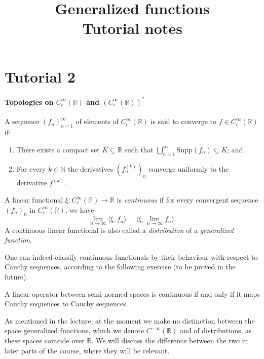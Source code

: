 \documentclass[12pt, draft,reqno,a4paper, twoside]{amsproc}
\title{Generalized functions\\Tutorial notes}
\newcommand{\supp}{\mathrm{Supp}}
\newcommand{\dbN}{\mathbb N}
\newcommand{\dbR}{\mathbb R}
\newcommand{\gen}[1]{\langle{#1}\rangle}
\begin{document}
\maketitle
\part*{Tutorial 2}\setcounter{section}{2}
\subsection{Topologies on $C_c^\infty(\dbR)$ and $(C_c^\infty(\dbR))^*$}
\begin{defi}[Convergence in $C_c^\infty(\dbR)$] A sequence $(f_n)_{n=1}^\infty$ of elements of $C_c^\infty(\dbR)$ is said to converge to $f\in C_c^\infty(\dbR)$ if:
\begin{enumerate}
\item There exists a compact set $K\subseteq \dbR$ such that $\bigcup_{n=1}^\infty \supp(f_n)\subseteq K$; and
\item For every $k\in\dbN$ the derivatives $(f_n^{(k)})_n$ converge uniformly to the derivative $f^{(k)}$.
\end{enumerate}
\end{defi}

\begin{defi}[Distributions] A linear functional $\xi:C_c^\infty(\dbR)\to \dbR$ is \emph{continuous} if for every convergent sequence $(f_n)_n$ in $C_c^{\infty}(\dbR)$, we have 
\[\lim_{n\to\infty}\gen{\xi,f_n}=\gen{\xi,\lim_{n\to\infty}f_n}.\]
A continuous linear functional is also called a \emph{distribution} of a \emph{generalized function}.
\end{defi}

\begin{rem} One can indeed classify continuous functionals by their behaviour with respect to Cauchy sequences, according to the following exercise (to be proved in the future).
\end{rem}

\begin{exer}A linear operator between semi-normed spaces is continuous if and only if it maps Cauchy sequences to Cauchy sequences.
\end{exer}

\begin{rem}As mentioned in the lecture, at the moment we make no distinction between the space generalized functions, which we denote $C^{-\infty}(\dbR)$ and of distributions, as these spaces coincide over $\dbR$. We will discuss the difference between the two in later parts of the course, where they will be relevant.
\end{rem}
\end{document}

